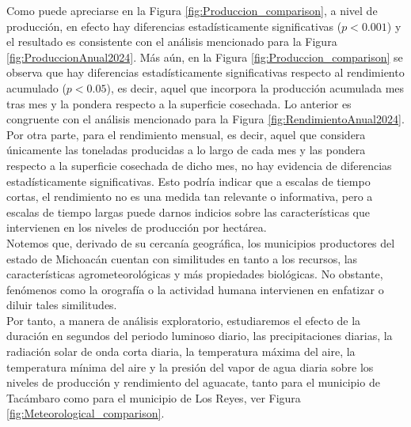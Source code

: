 Como puede apreciarse en la Figura \ref{fig:Produccion_comparison}, a nivel de producción, en efecto hay diferencias estadísticamente significativas ($p<0.001$) y el resultado es consistente con el análisis mencionado para la Figura \ref{fig:ProduccionAnual2024}. Más aún, en la Figura \ref{fig:Produccion_comparison} se observa que hay diferencias estadísticamente significativas respecto al rendimiento acumulado ($p<0.05$), es decir, aquel que incorpora la producción acumulada mes tras mes y la pondera respecto a la superficie cosechada. Lo anterior es congruente con el análisis mencionado para la Figura \ref{fig:RendimientoAnual2024}.\\

Por otra parte, para el rendimiento mensual, es decir, aquel que considera únicamente las toneladas producidas a lo largo de cada mes y las pondera respecto a la superficie cosechada de dicho mes, no hay evidencia de diferencias estadísticamente significativas. Esto podría indicar que a escalas de tiempo cortas, el rendimiento no es una medida tan relevante o informativa, pero a escalas de tiempo largas puede darnos indicios sobre las características que intervienen en los niveles de producción por hectárea.\\



Notemos que, derivado de su cercanía geográfica, los municipios productores del estado de Michoacán cuentan con similitudes en tanto a los recursos, las características agrometeorológicas y más propiedades biológicas. No obstante, fenómenos como la orografía o la actividad humana intervienen en enfatizar o diluir tales similitudes.\\

Por tanto, a manera de análisis exploratorio, estudiaremos el efecto de la duración en segundos del periodo luminoso diario, las precipitaciones diarias, la radiación solar de onda corta diaria, la temperatura máxima del aire, la temperatura mínima del aire y la presión del vapor de agua diaria sobre los niveles de producción y rendimiento del aguacate, tanto para el municipio de Tacámbaro como para el municipio de Los Reyes, ver Figura \ref{fig:Meteorological_comparison}.\\


